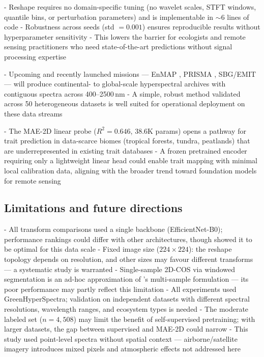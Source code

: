  - Reshape requires no domain-specific tuning (no wavelet
   scales, STFT windows, quantile bins, or perturbation
   parameters) and is implementable in $\sim$6 lines of
   code
 - Robustness across seeds (std $= 0.001$) ensures
   reproducible results without hyperparameter sensitivity
 - This lowers the barrier for ecologists and remote
   sensing practitioners who need state-of-the-art
   predictions without signal processing expertise

 - Upcoming and recently launched missions --- EnMAP
   \citep{guanter2015enmap}, PRISMA
   \citep{verrelst2021prisma}, SBG/EMIT
   \citep{cawse2021sbg, green2020emit} --- will produce continental-
   to global-scale hyperspectral archives with contiguous
   spectra across 400--2500\,nm
 - A simple, robust method validated across 50
   heterogeneous datasets is well suited for operational
   deployment on these data streams

 - The MAE-2D linear probe ($R^2 = 0.646$, 38.6K params)
   opens a pathway for trait prediction in data-scarce
   biomes (tropical forests, tundra, peatlands) that are
   underrepresented in existing trait databases
   \citep{kattge2020try, zhang2025ppadanet}
 - A frozen pretrained encoder requiring only a
   lightweight linear head could enable trait mapping
   with minimal local calibration data, aligning with the
   broader trend toward foundation models for remote
   sensing \citep{binfaruk2025terramae}


\subsection{Limitations and future directions}
\label{sec:disc_limitations}

 - All transform comparisons used a single backbone
   (EfficientNet-B0); performance rankings could differ
   with other architectures, though
   \citet{cherif2023spectra} showed it to be optimal for
   this data scale
 - Fixed image size ($224 \times 224$): the reshape
   topology depends on resolution, and other sizes may
   favour different transforms --- a systematic study is
   warranted
 - Single-sample 2D-COS via windowed segmentation is an
   ad-hoc approximation of \citet{noda2004twodimensional}'s
   multi-sample formulation --- its poor performance may
   partly reflect this limitation
 - All experiments used GreenHyperSpectra; validation on
   independent datasets with different spectral
   resolutions, wavelength ranges, and ecosystem types is
   needed
 - The moderate labeled set ($n = 4{,}508$) may limit the
   benefit of self-supervised pretraining; with larger
   datasets, the gap between supervised and MAE-2D could
   narrow
 - This study used point-level spectra without spatial
   context --- airborne/satellite imagery introduces mixed
   pixels and atmospheric effects not addressed here

